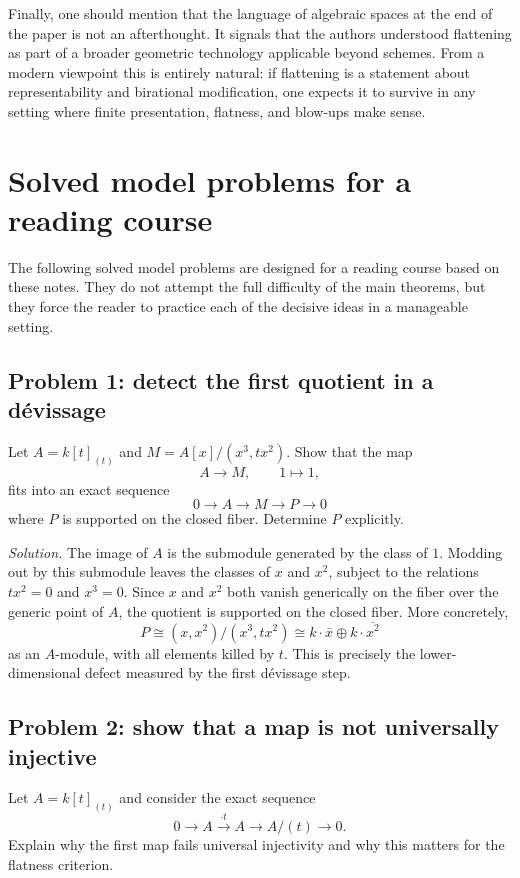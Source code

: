 \documentclass[11pt,oneside]{article}
\begin{document}
Finally, one should mention that the language of algebraic spaces at the end of the paper is not an afterthought.  It signals that the authors understood flattening as part of a broader geometric technology applicable beyond schemes.  From a modern viewpoint this is entirely natural: if flattening is a statement about representability and birational modification, one expects it to survive in any setting where finite presentation, flatness, and blow-ups make sense.

\section{Solved model problems for a reading course}

The following solved model problems are designed for a reading course based on these notes.  They do not attempt the full difficulty of the main theorems, but they force the reader to practice each of the decisive ideas in a manageable setting.

\subsection*{Problem 1: detect the first quotient in a d\'evissage}

Let $A=k[t]_{(t)}$ and $M=A[x]/(x^3,tx^2)$.  Show that the map
\[
A\longrightarrow M,
\qquad 1\mapsto 1,
\]
fits into an exact sequence
\[
0\to A\to M\to P\to 0
\]
where $P$ is supported on the closed fiber.  Determine $P$ explicitly.

\emph{Solution.}  The image of $A$ is the submodule generated by the class of $1$.  Modding out by this submodule leaves the classes of $x$ and $x^2$, subject to the relations $tx^2=0$ and $x^3=0$.  Since $x$ and $x^2$ both vanish generically on the fiber over the generic point of $A$, the quotient is supported on the closed fiber.  More concretely,
\[
P\cong (x,x^2)/(x^3,tx^2)\cong k\cdot \bar x\oplus k\cdot \overline{x^2}
\]
as an $A$-module, with all elements killed by $t$.  This is precisely the lower-dimensional defect measured by the first d\'evissage step.

\subsection*{Problem 2: show that a map is not universally injective}

Let $A=k[t]_{(t)}$ and consider the exact sequence
\[
0\to A\xrightarrow{\cdot t}A\to A/(t)\to 0.
\]
Explain why the first map fails universal injectivity and why this matters for the flatness criterion.
\end{document}
